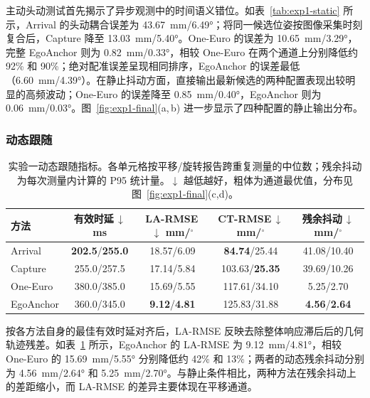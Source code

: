 \documentclass[review]{vgtc}
\begin{document}
主动头动测试首先揭示了异步观测中的时间语义错位。如表~\ref{tab:exp1-static} 所示，Arrival 的头动耦合误差为 43.67~mm/6.49°；将同一候选位姿按图像采集时刻复合后，Capture 降至 13.03~mm/5.40°。One-Euro 的误差为 10.65~mm/3.29°，完整 EgoAnchor 则为 0.82~mm/0.33°，相较 One-Euro 在两个通道上分别降低约 92\% 和 90\%；绝对配准误差呈现相同排序，EgoAnchor 的误差最低（6.60~mm/4.39°）。在静止抖动方面，直接输出最新候选的两种配置表现出较明显的高频波动；One-Euro 的误差降至 0.85~mm/0.40°，EgoAnchor 则为 0.06~mm/0.03°。图~\ref{fig:exp1-final}(a,\,b) 进一步显示了四种配置的静止输出分布。

\subsubsection{动态跟随}

\begin{table}[t]
\centering
\caption{实验一动态跟随指标。各单元格按平移/旋转报告跨重复测量的中位数；残余抖动为每次测量内计算的 P95 统计量。$\downarrow$ 越低越好，粗体为通道最优值，分布见图~\ref{fig:exp1-final}(c,d)。}
\label{tab:exp1-dynamic}
\setlength{\tabcolsep}{2pt}
\begin{tabular}{@{}lcccc@{}}
\toprule
方法 & \shortstack{有效时延\,$\downarrow$\\ms} & \shortstack{LA-RMSE\,$\downarrow$\\mm/$^\circ$} & \shortstack{CT-RMSE\,$\downarrow$\\mm/$^\circ$} & \shortstack{残余抖动\,$\downarrow$\\mm/$^\circ$} \\
\midrule
Arrival   & \textbf{202.5}/\textbf{255.0} & 18.57/6.09 & \textbf{84.74}/25.44 & 41.08/10.40 \\
Capture   & 255.0/257.5 & 17.14/5.84 & 103.63/\textbf{25.35} & 39.69/10.26 \\
One-Euro  & 380.0/385.0 & 15.69/5.55 & 117.61/34.10 & 5.25/2.70 \\
EgoAnchor & 360.0/345.0 & \textbf{9.12}/\textbf{4.81} & 125.83/31.88 & \textbf{4.56}/\textbf{2.64} \\
\bottomrule
\end{tabular}
\end{table}

按各方法自身的最佳有效时延对齐后，LA-RMSE 反映去除整体响应滞后后的几何轨迹残差。如表~\ref{tab:exp1-dynamic} 所示，EgoAnchor 的 LA-RMSE 为 9.12~mm/4.81°，相较 One-Euro 的 15.69~mm/5.55° 分别降低约 42\% 和 13\%；两者的动态残余抖动分别为 4.56~mm/2.64° 和 5.25~mm/2.70°。与静止条件相比，两种方法在残余抖动上的差距缩小，而 LA-RMSE 的差异主要体现在平移通道。
\end{document}
